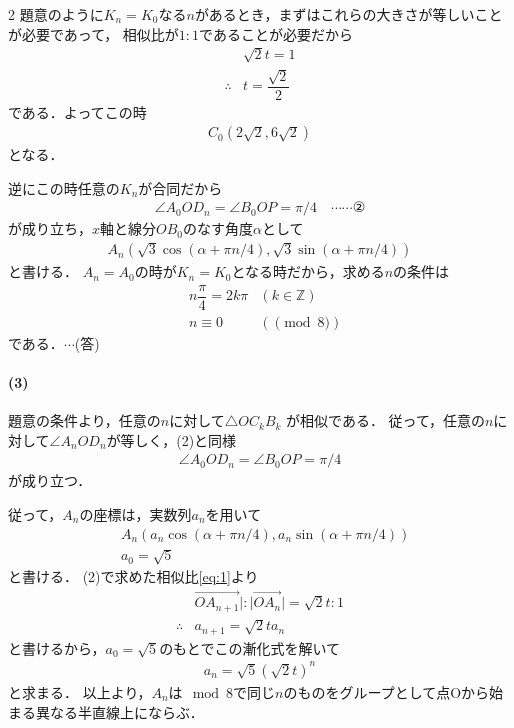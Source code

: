 \documentclass[../../main.tex]{subfiles}
\begin{document}
\begin{multicols}{2}
  題意のように$K_n=K_0$なる$n$があるとき，まずはこれらの大きさが等しいことが必要であって，
  相似比が$1:1$であることが必要だから
  \begin{align}
    & \sqrt{2}t = 1          \\
    \therefore
    & t = \dfrac{\sqrt{2}}{2}
  \end{align}
  である．よってこの時
  \begin{align}
    C_0(2\sqrt{2},6\sqrt{2})
  \end{align}
  となる．

  逆にこの時任意の$K_n$が合同だから
  \begin{align}
    \angle A_0OD_n = \angle B_0OP = \pi/4 \quad \cdots\cdots②
  \end{align}
  が成り立ち，$x$軸と線分$OB_0$のなす角度$\alpha$として
  \begin{align}
    A_n(\sqrt{3} \cos(\alpha + \pi n/4), \sqrt{3} \sin(\alpha + \pi n/4))
  \end{align}
  と書ける．
  $A_n=A_0$の時が$K_n=K_0$となる時だから，求める$n$の条件は
  \begin{align}
    & n\dfrac{\pi}{4} = 2k\pi & (k \in \mathbb{Z}) \\
    & n \equiv 0             & (\pmod{8})
  \end{align}
  である．$\cdots$(答)

  \paragraph{(3)}
  題意の条件より，任意の$n$に対して$\triangle OC_k B_k$ が相似である．
  従って，任意の$n$に対して$\angle A_nOD_n$が等しく，(2)と同様
  \begin{align}
    \angle A_0OD_n = \angle B_0OP = \pi/4
  \end{align}
  が成り立つ．

  従って，$A_n$の座標は，実数列$a_n$を用いて
  \begin{align}
    & A_n(a_n \cos(\alpha + \pi n/4), a_n \sin(\alpha + \pi n/4)) \label{eq:2} \\
    & a_0 = \sqrt{5}
  \end{align}
  と書ける．
  (2)で求めた相似比\cref{eq:1}より
  \begin{align}
    & \overrightarrow{OA_{n+1}}|: |\overrightarrow{OA_n}| = \sqrt{2}t : 1 \\
    \therefore
    & a_{n+1} = \sqrt{2}t a_{n}
  \end{align}
  と書けるから，$a_0=\sqrt{5}$のもとでこの漸化式を解いて
  \begin{align}
    a_n = \sqrt{5}\left(\sqrt{2}t\right)^{n} \label{eq:3}
  \end{align}
  と求まる．
  以上より，$A_n$は$\mod 8$で同じ$n$のものをグループとして点Oから始まる異なる半直線上にならぶ．


\end{multicols}
\end{document}
